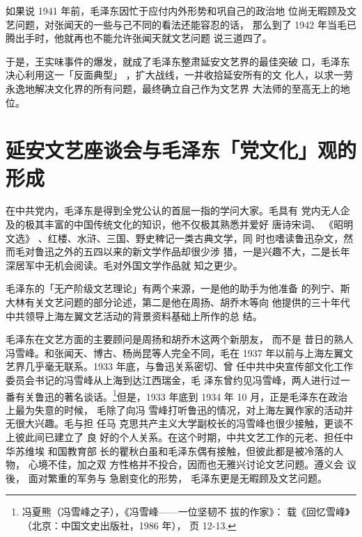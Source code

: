 如果说 1941 年前，毛泽东因忙于应付内外形势和巩自己的政治地
位尚无暇顾及文艺问题，对张闻天的一些与己不同的看法还能容忍的话，
那么到了 1942 年当毛已腾出手时，他就再也不能允许张闻天就文艺问题
说三道四了。

于是，王实味事件的爆发，就成了毛泽东整肃延安文艺界的最佳突破
口，毛泽东决心利用这一「反面典型」
，扩大战线，一并收拾延安所有的文
化人，以求一劳永逸地解决文化界的所有问题，最终确立自己作为文艺界
大法师的至高无上的地位。

\section{延安文艺座谈会与毛泽东「党文化」观的形成}
在中共党内，毛泽东是得到全党公认的首屈一指的学问大家。毛具有
党内无人企及的极其丰富的中国传统文化的知识，他不仅极其熟悉并爱好
唐诗宋词、
《昭明文选》
、红楼、水浒、三国、野史稗记一类古典文学，同
时也嗜读鲁迅杂文，然而毛对鲁迅之外的五四以来的新文学作品却很少涉
猎，一是兴趣不大，二是长年深居军中无机会阅读。毛对外国文学作品就
知之更少。

毛泽东的「无产阶级文艺理论」有两个来源，一是他的助手为他准备
的列宁、斯大林有关文艺问题的部分论述，第二是他在周扬、胡乔木等向
他提供的三十年代中共领导上海左翼文艺活动的背景资料基础上所作的总
结。

毛泽东在文艺方面的主要顾问是周扬和胡乔木这两个新朋友， 而不是 昔日的熟人
冯雪峰。和张闻天、博古、杨尚昆等人完全不同，毛在 1937 年以前与上海左翼文
艺界几乎毫无联系。1933 年底，与鲁迅关系密切、曾 任中共中央宣传部文化工作
委员会书记的冯雪峰从上海到达江西瑞金，毛 泽东曾约见冯雪峰，两人进行过一
番有关鲁迅的著名谈话。\footnote{冯夏熊（冯雪峰之子），《冯雪峰——一位坚韧不
拔的作家》： 载《回忆雪峰》（北京：中国文史出版社，1986 年）， 页
12-13.}但是，1933 年底到 1934 年 10 月，正是毛泽东在政治上最为失意的时候，
毛除了向冯 雪峰打听鲁迅的情况，对上海左翼作家的活动并无很大兴趣。毛与担
任马 克思共产主义大学副校长的冯雪峰也很少接触，更谈不上彼此间已建立了 良
好的个人关系。在这个时期，中共文艺工作的元老、担任中华苏维埃 和国教育部
长的瞿秋白虽和毛泽东偶有接触，但彼此都是被冷落的人物， 心境不佳，加之双
方性格并不投合，因而也无雅兴讨论文艺问题。遵义会 议後， 面对繁重的军务与
急剧变化的形势， 毛泽东更是无暇顾及文艺问题。


